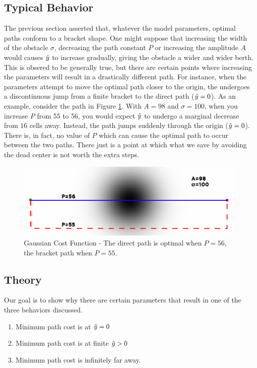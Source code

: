 \subsection{Typical Behavior}

The previous section asserted that, whatever the model parameters, optimal paths conform to a bracket shape. One might suppose that increasing the width of the obstacle $\sigma$, decreasing the path constant $P$ or increasing the amplitude $A$ would causes $\hat{y}$ to increase gradually, giving the obstacle a wider and wider berth. This is obsered to be generally true, but there are certain points where increasing the parameters will result in a drastically different path. 
For instance, when the parameters attempt to move the optimal path closer to the origin, the undergoes a discontinuous jump from a finite bracket to the direct path ($\hat{y}=0$). As an example, consider the path in Figure \ref{fig:gaussian}. With $A=98$ and $\sigma=100$, when you increase $P$ from 55 to 56, you would expect $\hat{y}$ to undergo a marginal decrease from $16$ cells away. Instead, the path jumps suddenly through the origin ($\hat{y}=0$). There is, in fact, no value of $P$ which can cause the optimal path to occur between the two paths. There just is a point at which what we save by avoiding the dead center is not worth the extra steps.

\begin{figure}
\includegraphics[width=\columnwidth]{graphix/Gaussian.png}
\caption{Gaussian Cost Function - The direct path is optimal when $P=56$, the bracket path when $P=55$. }
\label{fig:gaussian}
\end{figure}

\subsection{Theory}
Our goal is to show why there are certain parameters that result in one of the three behaviors discussed. 
\begin{enumerate}
\item Minimum path cost is at $\hat{y}=0$
\item Minimum path cost is at finite $\hat{y}>0$
\item Minimum path cost is infinitely far away. 
\end{enumerate}

